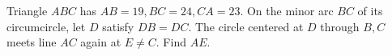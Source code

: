 Triangle $ABC$ has $AB=19,BC=24,CA=23$. On the minor arc $BC$ of its circumcircle, let $D$ satisfy $DB=DC$. The circle centered at $D$ through $B,C$ meets line $AC$ again at $E\ne C$. Find $AE$.
